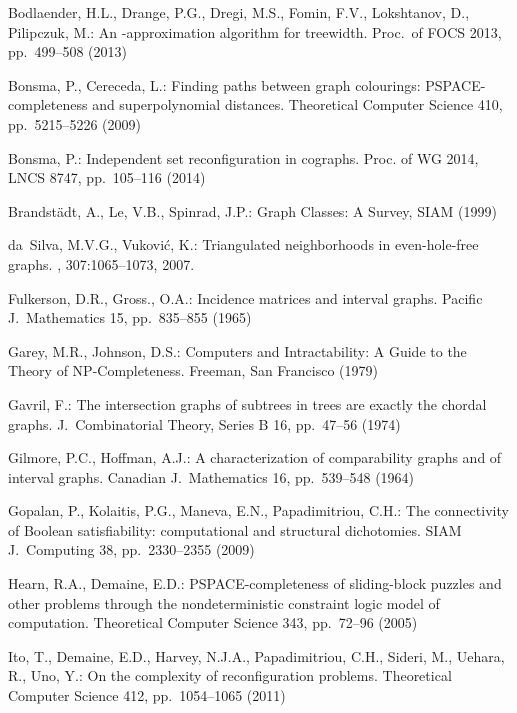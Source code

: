 \documentclass{llncs}
\begin{document}

\begin{thebibliography}{99}


Bodlaender, H.L., Drange, P.G., Dregi, M.S., Fomin, F.V., Lokshtanov, D., Pilipczuk, M.:
An  -approximation algorithm for treewidth.
Proc.\ of FOCS 2013, pp.~499--508 (2013)

Bonsma, P., Cereceda, L.: 
Finding paths between graph colourings: PSPACE-completeness and superpolynomial distances. 
Theoretical Computer Science 
410, pp.~5215--5226 (2009)  

Bonsma, P.: 
Independent set reconfiguration in cographs. 
Proc. of WG 2014, LNCS 8747, pp.~105--116 (2014)

Brandst\"adt, A., Le, V.B., Spinrad, J.P.:
Graph Classes: A Survey, SIAM (1999)

da~Silva, M.V.G., Vukovi\'c, K.:
\newblock Triangulated neighborhoods in even-hole-free graphs.
, 307:1065--1073, 2007.

Fulkerson, D.R., Gross., O.A.:
Incidence matrices and interval graphs.
Pacific J.~Mathematics 15, pp.~835--855 (1965)

Garey, M.R., Johnson, D.S.:
Computers and Intractability: A Guide to the Theory of {NP}-Completeness.
Freeman, San Francisco (1979)

Gavril, F.:
The intersection graphs of subtrees in trees are exactly the chordal graphs.
J.~Combinatorial Theory, Series B 16, pp.~47--56 (1974)

Gilmore, P.C., Hoffman, A.J.:
A characterization of comparability graphs and of interval graphs.
Canadian J.~Mathematics 16, pp.~539--548 (1964)

Gopalan, P., Kolaitis, P.G., Maneva, E.N., Papadimitriou, C.H.:
The connectivity of Boolean satisfiability: computational and structural dichotomies.
SIAM J.~Computing 38, pp.~2330--2355 (2009)  

Hearn, R.A., Demaine, E.D.: 
PSPACE-completeness of sliding-block puzzles and other problems through the nondeterministic constraint logic model of computation. 
Theoretical Computer Science 
343, pp.~72--96 (2005) 


Ito, T., Demaine, E.D., Harvey, N.J.A., Papadimitriou, C.H., Sideri, M., Uehara, R., Uno, Y.: 
On the complexity of reconfiguration problems.
Theoretical Computer Science 
412, pp.~1054--1065 (2011)


\end{thebibliography}
\end{document}
